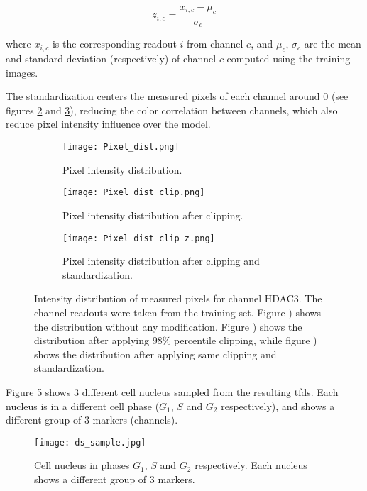 \begin{equation}
  z_{i,c} = \frac{x_{i,c} - \mu_c}{\sigma_c}
  \label{eq:data_pp:z-score}
\end{equation}

\noindent where $x_{i,c}$ is the corresponding readout $i$ from channel $c$, and $\mu_c$, $\sigma_c$ are the mean and standard deviation (respectively) of channel $c$ computed using the training images.

The standardization centers the measured pixels of each channel around 0 (see figures \ref{fig:data_pp:pixel_dist:clip} and \ref{fig:data_pp:pixel_dist:clip_z}), reducing the color correlation between channels, which also reduce pixel intensity influence over the model.

\begin{figure}[htb]
  \centering
  \begin{subfigure}[t]{.29\linewidth}
    \texttt{[image: Pixel\_dist.png]}
    \caption{Pixel intensity distribution.}
    \label{fig:data_pp:pixel_dist:ori}
  \end{subfigure}
  \hspace{4mm}
  \begin{subfigure}[t]{.3\linewidth}
    \texttt{[image: Pixel\_dist\_clip.png]}
    \caption{Pixel intensity distribution after clipping.}
    \label{fig:data_pp:pixel_dist:clip}
  \end{subfigure}
  \hspace{4mm}
  \begin{subfigure}[t]{.28\linewidth}
    \texttt{[image: Pixel\_dist\_clip\_z.png]}
    \caption{Pixel intensity distribution after clipping and standardization.}
    \label{fig:data_pp:pixel_dist:clip_z}
  \end{subfigure}
  \caption{Intensity distribution of measured pixels for channel HDAC3. The channel readouts were taken from the training set. Figure ) shows the distribution without any modification. Figure ) shows the distribution after applying $98\%$ percentile clipping, while figure ) shows the distribution after applying same clipping and standardization.}
  \label{fig:data_pp:pixel_dist}
\end{figure}

Figure \ref{fig:data_pp:cell_sample} shows 3 different cell nucleus sampled from the resulting \gls{tfds}. Each nucleus is in a different cell phase ($G_1$, $S$ and $G_2$ respectively), and shows a different group of 3 markers (channels).

\begin{figure}[htb]
  \centering
  \texttt{[image: ds\_sample.jpg]}
  \caption{Cell nucleus in phases $G_1$, $S$ and $G_2$ respectively. Each nucleus shows a different group of 3 markers.}
  \label{fig:data_pp:cell_sample}
\end{figure}
